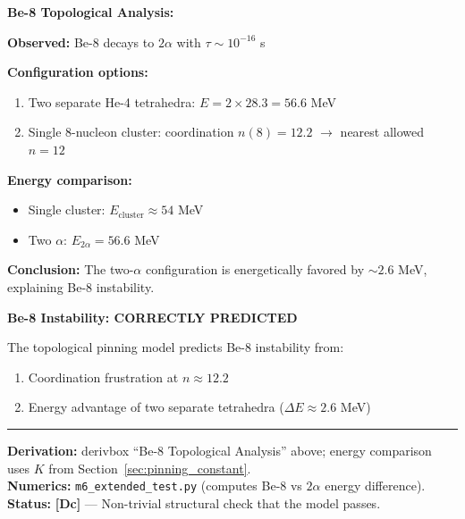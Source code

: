 \documentclass[11pt,a4paper]{article}
\newcommand{\tagDc}{\textcolor{blue!70!black}{\textbf{[Dc]}}}
\begin{document}
\begin{derivbox}
\textbf{Be-8 Topological Analysis:}

\textbf{Observed:} Be-8 decays to $2\alpha$ with $\tau \sim 10^{-16}$ s

\textbf{Configuration options:}
\begin{enumerate}
    \item Two separate He-4 tetrahedra: $E = 2 \times 28.3 = 56.6$ MeV
    \item Single 8-nucleon cluster: coordination $n(8) = 12.2$ $\to$ nearest allowed $n = 12$
\end{enumerate}

\textbf{Energy comparison:}
\begin{itemize}[nosep]
    \item Single cluster: $E_{\text{cluster}} \approx 54$ MeV
    \item Two $\alpha$: $E_{2\alpha} = 56.6$ MeV
\end{itemize}

\textbf{Conclusion:} The two-$\alpha$ configuration is energetically favored by $\sim 2.6$ MeV, explaining Be-8 instability.
\end{derivbox}

\begin{resultbox}
\textbf{Be-8 Instability: CORRECTLY PREDICTED}

The topological pinning model predicts Be-8 instability from:
\begin{enumerate}
    \item Coordination frustration at $n \approx 12.2$
    \item Energy advantage of two separate tetrahedra ($\Delta E \approx 2.6$ MeV)
\end{enumerate}

\vspace{0.3em}\hrule\vspace{0.3em}
\textbf{Derivation:} derivbox ``Be-8 Topological Analysis'' above; energy comparison uses $K$ from Section~\ref{sec:pinning_constant}.\\
\textbf{Numerics:} \texttt{m6\_extended\_test.py} (computes Be-8 vs $2\alpha$ energy difference).\\
\textbf{Status:} \tagDc{} --- Non-trivial structural check that the model passes.
\end{resultbox}

\newpage

\end{document}
